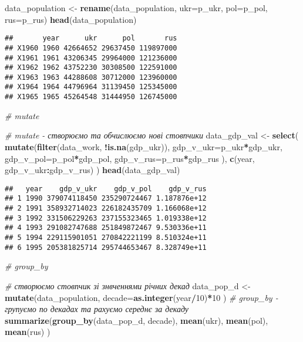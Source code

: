 \documentclass[
]{article}
\newenvironment{Shaded}{\begin{snugshade}}{\end{snugshade}}
\newcommand{\CommentTok}[1]{\textcolor[rgb]{0.56,0.35,0.01}{\textit{#1}}}
\newcommand{\DataTypeTok}[1]{\textcolor[rgb]{0.13,0.29,0.53}{#1}}
\newcommand{\DecValTok}[1]{\textcolor[rgb]{0.00,0.00,0.81}{#1}}
\newcommand{\KeywordTok}[1]{\textcolor[rgb]{0.13,0.29,0.53}{\textbf{#1}}}
\newcommand{\NormalTok}[1]{#1}
\newcommand{\OperatorTok}[1]{\textcolor[rgb]{0.81,0.36,0.00}{\textbf{#1}}}
\newcommand{\StringTok}[1]{\textcolor[rgb]{0.31,0.60,0.02}{#1}}
\begin{document}
\begin{Shaded}
\begin{Highlighting}[]
\NormalTok{data_population <-}\StringTok{ }\KeywordTok{rename}\NormalTok{(data_population, }\DataTypeTok{ukr=}\NormalTok{p_ukr, }\DataTypeTok{pol=}\NormalTok{p_pol, }\DataTypeTok{rus=}\NormalTok{p_rus)}
\KeywordTok{head}\NormalTok{(data_population)}
\end{Highlighting}
\end{Shaded}

\begin{verbatim}
##       year      ukr      pol       rus
## X1960 1960 42664652 29637450 119897000
## X1961 1961 43206345 29964000 121236000
## X1962 1962 43752230 30308500 122591000
## X1963 1963 44288608 30712000 123960000
## X1964 1964 44796964 31139450 125345000
## X1965 1965 45264548 31444950 126745000
\end{verbatim}

\begin{Shaded}
\begin{Highlighting}[]
\CommentTok{# mutate}

\CommentTok{# mutate - створюємо та обчислюємо нові стовпчики}
\NormalTok{data_gdp_val <-}\StringTok{ }\KeywordTok{select}\NormalTok{(}
  \KeywordTok{mutate}\NormalTok{(}\KeywordTok{filter}\NormalTok{(data_work, }\OperatorTok{!}\KeywordTok{is.na}\NormalTok{(gdp_ukr)), }
    \DataTypeTok{gdp_v_ukr=}\NormalTok{p_ukr}\OperatorTok{*}\NormalTok{gdp_ukr,}
    \DataTypeTok{gdp_v_pol=}\NormalTok{p_pol}\OperatorTok{*}\NormalTok{gdp_pol,}
    \DataTypeTok{gdp_v_rus=}\NormalTok{p_rus}\OperatorTok{*}\NormalTok{gdp_rus}
\NormalTok{  ),}
  \KeywordTok{c}\NormalTok{(year, gdp_v_ukr}\OperatorTok{:}\NormalTok{gdp_v_rus)}
\NormalTok{)}
\KeywordTok{head}\NormalTok{(data_gdp_val)}
\end{Highlighting}
\end{Shaded}

\begin{verbatim}
##   year    gdp_v_ukr    gdp_v_pol    gdp_v_rus
## 1 1990 379074118450 235290724467 1.187876e+12
## 2 1991 358932714023 226182435709 1.166068e+12
## 3 1992 331506229263 237155323465 1.019338e+12
## 4 1993 291082747688 251849872467 9.530336e+11
## 5 1994 229115901051 270842221199 8.510324e+11
## 6 1995 205381825714 295744653467 8.328749e+11
\end{verbatim}

\begin{Shaded}
\begin{Highlighting}[]
\CommentTok{# group_by}

\CommentTok{# створюємо стовпчик зі знвченнями річних декад}
\NormalTok{data_pop_d <-}\StringTok{ }\KeywordTok{mutate}\NormalTok{(data_population, }
  \DataTypeTok{decade=}\KeywordTok{as.integer}\NormalTok{(year}\OperatorTok{/}\DecValTok{10}\NormalTok{)}\OperatorTok{*}\DecValTok{10}
\NormalTok{)}
\CommentTok{# group_by - групуємо по декадах та  рахуємо середнє за декаду}
\KeywordTok{summarize}\NormalTok{(}\KeywordTok{group_by}\NormalTok{(data_pop_d, decade), }
  \KeywordTok{mean}\NormalTok{(ukr), }\KeywordTok{mean}\NormalTok{(pol), }\KeywordTok{mean}\NormalTok{(rus)}
\NormalTok{)}
\end{Highlighting}
\end{Shaded}
\end{document}
